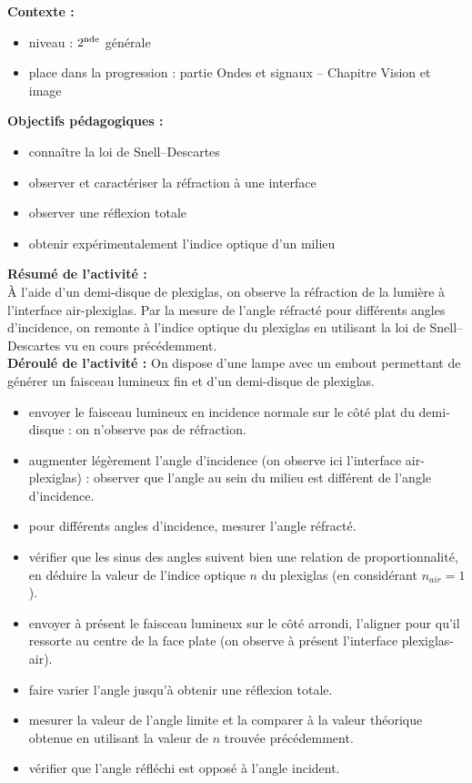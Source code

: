 \documentclass[a4paper,11pt]{article} %
\newenvironment{encart}[1]{%
	\begin{tcolorbox}
		[
		breakable, enhanced jigsaw, %
		arc = 1mm, %
		title = \textbf{#1}, %
		coltitle = white, %
		colbacktitle = blue, %
		colback = white, %
		colframe = blue %
		]
}{		
	\end{tcolorbox}
}
\begin{document}
	
	\begin{encart}{Activité pédagogique 2 : réfraction à une interface -- Loi de Snell-Descartes}
		\textbf{Contexte :}
		\begin{itemize}
			\item niveau : $ 2^\textup{nde} $ générale
			\item place dans la progression : partie Ondes et signaux -- Chapitre Vision et image
		\end{itemize}
		\vspace{0.5cm}
		
		\textbf{Objectifs pédagogiques :}
		\begin{itemize}
			\item connaître la loi de Snell--Descartes
			\item observer et caractériser la réfraction à une interface
			\item observer une réflexion totale
			\item obtenir expérimentalement l'indice optique d'un milieu
		\end{itemize}
		\vspace{0.5cm}
		
		\textbf{Résumé de l'activité :}\\
		\`A l'aide d'un demi-disque de plexiglas, on observe la réfraction de la lumière à l'interface air-plexiglas. Par la mesure de l'angle réfracté pour différents angles d'incidence, on remonte à l'indice optique du plexiglas en utilisant la loi de Snell--Descartes vu en cours précédemment.\\
		
		\textbf{Déroulé de l'activité :}
		On dispose d'une lampe avec un embout permettant de générer un faisceau lumineux fin et d'un demi-disque de plexiglas.
		\begin{itemize}
			\item envoyer le faisceau lumineux en incidence normale sur le côté plat du demi-disque : on n'observe pas de réfraction.
			\item augmenter légèrement l'angle d'incidence (on observe ici l'interface air-plexiglas) : observer que l'angle au sein du milieu est différent de l'angle d'incidence.
			\item pour différents angles d'incidence, mesurer l'angle réfracté.
			\item vérifier que les sinus des angles suivent bien une relation de proportionnalité, en déduire la valeur de l'indice optique $ n $ du plexiglas (en considérant $ n_{air} = 1 $).
			\item envoyer à présent le faisceau lumineux sur le côté arrondi, l'aligner pour qu'il ressorte au centre de la face plate (on observe à présent l'interface plexiglas-air).
			\item faire varier l'angle  jusqu'à obtenir une réflexion totale.
			\item mesurer la valeur de l'angle limite et la comparer à la valeur théorique obtenue en utilisant la valeur de $ n $ trouvée précédemment.
			\item vérifier que l'angle réfléchi est opposé à l'angle incident.
		\end{itemize}
		

\end{encart}
\end{document}
